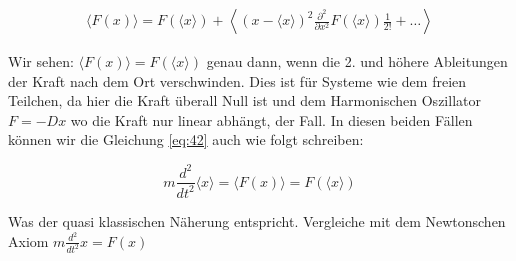 \begin{align}
 \langle F(x) \rangle =   F(\langle x\rangle ) + \left\langle (x-\langle x\rangle)^2 \frac{\partial^2 }{\partial x^2} F(\langle x\rangle )\frac{1}{2!}+\dots \right\rangle 
\end{align}

Wir sehen: \(\langle F(x)\rangle = F(\langle x\rangle )\) genau dann, wenn die 2. und höhere Ableitungen der Kraft nach dem Ort verschwinden. Dies ist für Systeme wie dem freien Teilchen, da hier die Kraft überall Null ist und dem Harmonischen Oszillator \(F=-Dx\) wo die Kraft nur linear abhängt, der Fall. In diesen beiden Fällen können wir die Gleichung \eqref{eq:42} auch wie folgt schreiben:

\[ m\frac{d^2}{dt^2} \langle x \rangle  = \langle F(x) \rangle = F(\langle x\rangle )   \]

Was der quasi klassischen Näherung entspricht. Vergleiche mit dem Newtonschen Axiom \(m\frac{d^2}{dt^2} x  = F(x)  \)






